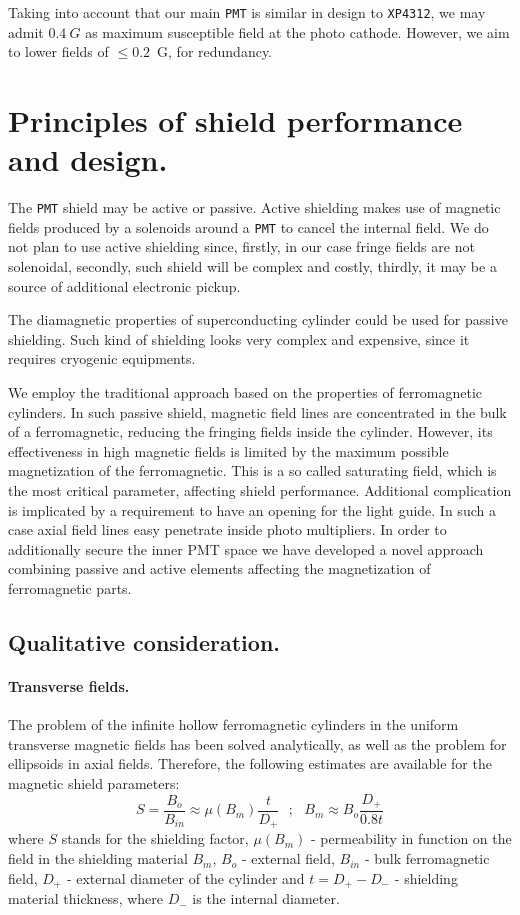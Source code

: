 \documentclass[12pt]{article}
\begin{document}
Taking into account that our  main {\tt PMT} is similar in design to {\tt XP4312},
we  may  admit $0.4~G$  as maximum susceptible field at the photo cathode.
However, we aim to lower fields of $\leq0.2$~G, for redundancy.


\section{Principles of shield performance and design.}
\label{sec:principles}
The   {\tt PMT} shield may be active or passive.
Active shielding makes use of  magnetic fields produced by a  solenoids  around a {\tt PMT} to
cancel the internal  field. We do not plan to use  active shielding since,
firstly,  in our case fringe  fields
are  not solenoidal, secondly,  such shield  will be complex and costly,
thirdly, it may be a source of additional electronic pickup.

The diamagnetic properties
of superconducting cylinder could be  used for passive shielding.
Such  kind of shielding looks very complex and expensive, 
since it requires cryogenic equipments.

We employ the  traditional approach  based on the  properties of 
ferromagnetic cylinders.
In such passive shield, magnetic field lines are concentrated in the bulk of a
ferromagnetic, reducing the fringing fields inside the cylinder.
However, its effectiveness  in high magnetic fields is limited by the
maximum possible magnetization of  the  ferromagnetic.
This is a so called  saturating field, 
which  is the most critical parameter, affecting shield performance.
Additional complication is implicated by a requirement to have an 
opening for the light guide.  
In such a  case axial  field lines easy penetrate inside photo multipliers.
In order to additionally secure the inner PMT space  we have developed a novel approach combining 
passive and active  elements affecting the magnetization of ferromagnetic parts.

\subsection{Qualitative consideration.}

\paragraph{Transverse fields.}
The problem of the  infinite  hollow ferromagnetic cylinders in the uniform
transverse magnetic fields has been  solved 
analytically\cite{eltongluex}, 
as well as the problem  for ellipsoids in axial fields.  
Therefore,  the following estimates
are available for the  magnetic shield parameters:
\begin{equation}
S=\frac{B_o}{B_{in}}\approx \mu({B_m})\frac{t}{D_+}~~~;~~~B_m\approx B_o\frac{D_+}{0.8t}
\label{eq000}
\end{equation}
where $S$ stands for the shielding factor,
$\mu(B_m)$ - permeability in function  on the field in the shielding material $B_m$,
$B_o$ - external  field, 
$B_{in}$ - bulk  ferromagnetic field,
$D_+$ - external diameter of the cylinder and
$t=D_+-D_-$ - shielding material thickness, where $D_-$ 
is the internal diameter. 
\end{document}
